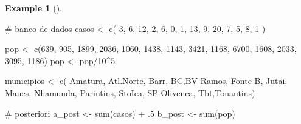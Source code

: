 \documentclass[
  letterpaper,
  DIV=11,
  numbers=noendperiod]{scrreprt}
\newenvironment{Shaded}{\begin{snugshade}}{\end{snugshade}}
\newcommand{\CommentTok}[1]{\textcolor[rgb]{0.37,0.37,0.37}{#1}}
\newcommand{\DecValTok}[1]{\textcolor[rgb]{0.68,0.00,0.00}{#1}}
\newcommand{\FunctionTok}[1]{\textcolor[rgb]{0.28,0.35,0.67}{#1}}
\newcommand{\NormalTok}[1]{\textcolor[rgb]{0.00,0.23,0.31}{#1}}
\newcommand{\OtherTok}[1]{\textcolor[rgb]{0.00,0.23,0.31}{#1}}
\newcommand{\SpecialCharTok}[1]{\textcolor[rgb]{0.37,0.37,0.37}{#1}}
\newcommand{\StringTok}[1]{\textcolor[rgb]{0.13,0.47,0.30}{#1}}
\theoremstyle{definition}
\theoremstyle{plain}
\theoremstyle{definition}
\newtheorem{example}{Example}[chapter]
\theoremstyle{remark}
\begin{document}
\begin{example}[]
\begin{Shaded}
\begin{Highlighting}[]
\CommentTok{\# banco de dados}
\NormalTok{casos }\OtherTok{\textless{}{-}} \FunctionTok{c}\NormalTok{( }\DecValTok{3}\NormalTok{, }\DecValTok{6}\NormalTok{, }\DecValTok{12}\NormalTok{, }\DecValTok{2}\NormalTok{, }\DecValTok{6}\NormalTok{, }\DecValTok{0}\NormalTok{, }\DecValTok{1}\NormalTok{, }\DecValTok{13}\NormalTok{, }\DecValTok{9}\NormalTok{, }\DecValTok{20}\NormalTok{, }\DecValTok{7}\NormalTok{, }\DecValTok{5}\NormalTok{, }\DecValTok{8}\NormalTok{, }\DecValTok{1}\NormalTok{ )   }

\NormalTok{pop }\OtherTok{\textless{}{-}} \FunctionTok{c}\NormalTok{(}\DecValTok{639}\NormalTok{, }\DecValTok{905}\NormalTok{, }\DecValTok{1899}\NormalTok{, }\DecValTok{2036}\NormalTok{, }\DecValTok{1060}\NormalTok{, }\DecValTok{1438}\NormalTok{, }\DecValTok{1143}\NormalTok{, }\DecValTok{3421}\NormalTok{, }\DecValTok{1168}\NormalTok{, }\DecValTok{6700}\NormalTok{, }\DecValTok{1608}\NormalTok{, }\DecValTok{2033}\NormalTok{, }\DecValTok{3095}\NormalTok{, }\DecValTok{1186}\NormalTok{)}
\NormalTok{pop }\OtherTok{\textless{}{-}}\NormalTok{ pop}\SpecialCharTok{/}\DecValTok{10}\SpecialCharTok{\^{}}\DecValTok{5}

\NormalTok{municipios }\OtherTok{\textless{}{-}} \FunctionTok{c}\NormalTok{( }\StringTok{\textquotesingle{}Amatura\textquotesingle{}}\NormalTok{, }\StringTok{\textquotesingle{}Atl.Norte\textquotesingle{}}\NormalTok{, }\StringTok{\textquotesingle{}Barr\textquotesingle{}}\NormalTok{, }\StringTok{\textquotesingle{}BC\textquotesingle{}}\NormalTok{,}\StringTok{\textquotesingle{}BV Ramos\textquotesingle{}}\NormalTok{, }\StringTok{\textquotesingle{}Fonte B\textquotesingle{}}\NormalTok{, }\StringTok{\textquotesingle{}Jutai\textquotesingle{}}\NormalTok{, }\StringTok{\textquotesingle{}Maues\textquotesingle{}}\NormalTok{, }\StringTok{\textquotesingle{}Nhamunda\textquotesingle{}}\NormalTok{, }\StringTok{\textquotesingle{}Parintins\textquotesingle{}}\NormalTok{, }\StringTok{\textquotesingle{}StoIca\textquotesingle{}}\NormalTok{, }\StringTok{\textquotesingle{}SP Olivenca\textquotesingle{}}\NormalTok{, }\StringTok{\textquotesingle{}Tbt\textquotesingle{}}\NormalTok{,}\StringTok{\textquotesingle{}Tonantins\textquotesingle{}}\NormalTok{)}
\end{Highlighting}
\end{Shaded}

\begin{Shaded}
\begin{Highlighting}[]
\CommentTok{\# posteriori}
\NormalTok{a\_post }\OtherTok{\textless{}{-}} \FunctionTok{sum}\NormalTok{(casos) }\SpecialCharTok{+}\NormalTok{ .}\DecValTok{5}
\NormalTok{b\_post }\OtherTok{\textless{}{-}} \FunctionTok{sum}\NormalTok{(pop)}


\end{Highlighting}
\end{Shaded}
\end{example}
\end{document}
